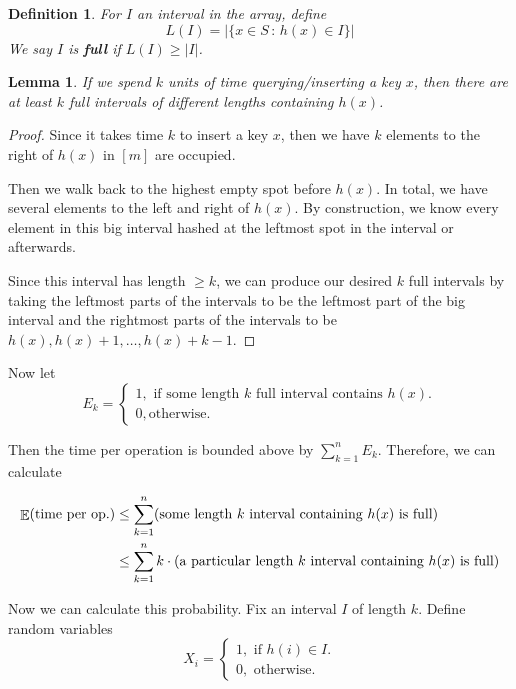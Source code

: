 \documentclass[11pt]{article}
\DeclareMathOperator*{\E}{\mathbb{E}}
\let\Pr\relax
\DeclareMathOperator*{\Pr}{\mathbb{P}}
\newtheorem{lemma}[theorem]{Lemma}
\newtheorem{definition}[theorem]{Definition}
\begin{document}
\begin{definition}
  For $I$ an interval in the array, define $$L(I) = |\{x \in S\,:\,h(x) \in I\}|$$
  We say $I$ is \textbf{full} if $L(I) \geq |I|$. 
\end{definition}

\begin{lemma}
  If we spend $k$ units of time querying/inserting a key $x$, then there are at least $k$ full intervals of different lengths containing $h(x)$. 
  \label{lem:kfull}
\end{lemma}

\begin{proof}
  Since it takes time $k$ to insert a key $x$, then we have $k$ elements to the right of $h(x)$ in $[m]$ are occupied. 

  Then we walk back to the highest empty spot before $h(x)$. In total, we have several elements to the left and right of $h(x)$. By construction, we know every element in this big interval hashed at the leftmost spot in the interval or afterwards. 

  Since this interval has length $\geq k$, we can produce our desired $k$ full intervals by taking the leftmost parts of the intervals to be the leftmost part of the big interval and the rightmost parts of the intervals to be $h(x), h(x)+1, \dots, h(x) + k-1$. 
\end{proof}

Now let 
$$E_k = \begin{cases} 1, \text{ if some length $k$ full interval contains $h(x)$.} \\
  0, \text{otherwise.} \end{cases} $$

Then the time per operation is bounded above by $\sum_{k=1}^n E_k$. Therefore, we can calculate

\begin{align*}
  \E(\text{time per op.}) &\leq \sum_{k=1}^n \Pr(\text{some length $k$ interval containing $h(x)$ is full}) \\
  &\leq \sum_{k=1}^n k \cdot \Pr(\text{a particular length $k$ interval containing $h(x)$ is full})
\end{align*}

Now we can calculate this probability. Fix an interval $I$ of length $k$. Define random variables
$$X_i = \begin{cases} 1, \text{ if $h(i) \in I$.} \\
  0, \text{ otherwise.} \end{cases}$$
\end{document}
